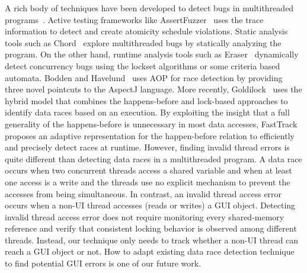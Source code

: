 A rich body of techniques have been developed to detect bugs in multithreaded programs~\cite{Huang:2011:PPC:2001420.2001438, Weeratunge:2010, Huang:2011:EST}.
Active testing frameworks like AssertFuzzer~\cite{Sen:2008} uses the trace information to detect
and create atomicity schedule violations. Static analysis tools such as Chord~\cite{Naik:2006}
 explore multithreaded bugs by statically analyzing the program. On the
other hand, runtime analysis tools such as Eraser~\cite{Savage:1997}  dynamically detect concurrency bugs using the lockset
algorithms or some criteria based automata. Bodden and Havelund~\cite{Bodden:2008} uses AOP for
race detection by providing three novel pointcuts to the AspectJ language. More recently,
Goldilock~\cite{Elmas:2007} uses the hybrid model that combines the happens-before and lock-based
approaches to identify data races based on an execution. By exploiting the insight
that a full generality of the happens-before is unnecessary in most data accesses,
FastTrack~\cite{Flanagan:2009} proposes an adaptive representation for the happen-before
relation to efficiently and precisely detect races at runtime. However, finding
invalid thread errors is quite different than detecting data races in
a multithreaded program. A data race occurs when two concurrent threads access
a shared variable and when at least one access is a write and the threads
use no explicit mechanism to prevent the accesses from being simultaneous. In contrast,
an invalid thread access error occurs when a non-UI thread accesses (reads or writes) a GUI object.
Detecting invalid thread access error does not require monitoring every shared-memory
reference and verify that consistent locking behavior is observed among different threads. Instead,
our technique only needs to track whether a non-UI thread can reach a GUI object or not.
How to adapt existing data race detection technique to find potential
GUI errors is one of our future work.



